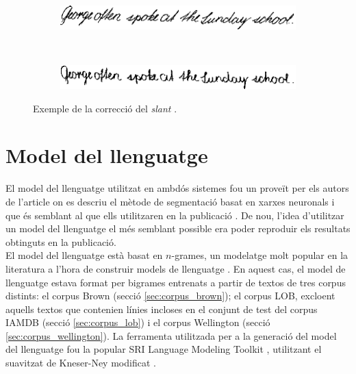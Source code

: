 \begin{figure}
\centering
\begin{subfigure}[b]{0.8\textwidth}
\centering
\includegraphics[width=\textwidth]{images/slant_orig.eps}
\caption{}\label{fig:slant_correction_orig}
\end{subfigure}\\
\begin{subfigure}[b]{0.8\textwidth}
\centering
\includegraphics[width=\textwidth]{images/slant_corr.eps}
\caption{}\label{fig:slant_correction_result}
\end{subfigure}
\caption{Exemple de la correcció del \emph{slant} \cite{Pastor07}.}\label{fig:slant_correction}
\end{figure}

\section{Model del llenguatge}
El model del llenguatge utilitzat en ambdós sistemes fou un proveït per els autors de l'article on es descriu el mètode de segmentació basat en xarxes neuronals i que és semblant al que ells utilitzaren en la publicació \cite{espana2011improving}. De nou, l'idea d'utilitzar un model del llenguatge el més semblant possible era poder reproduir els resultats obtinguts en la publicació.\\

El model del llenguatge està basat en $n$-grames, un modelatge molt popular en la literatura a l'hora de construir models de llenguatge \cite{ManningSchuetze99}. En aquest cas, el model de llenguatge estava format per bigrames entrenats a partir de textos de tres corpus distints: el corpus Brown (secció \ref{sec:corpus_brown}); el corpus LOB, excloent aquells textos que contenien línies incloses en el conjunt de test del corpus IAMDB  (secció \ref{sec:corpus_lob}) i el corpus Wellington (secció \ref{sec:corpus_wellington}). La ferramenta utilitzada per a la generació del model del llenguatge fou la popular SRI Language Modeling Toolkit \cite{stolcke2002srilm}, utilitzant el suavitzat de Kneser-Ney modificat \cite{chen1999empirical}.\\

